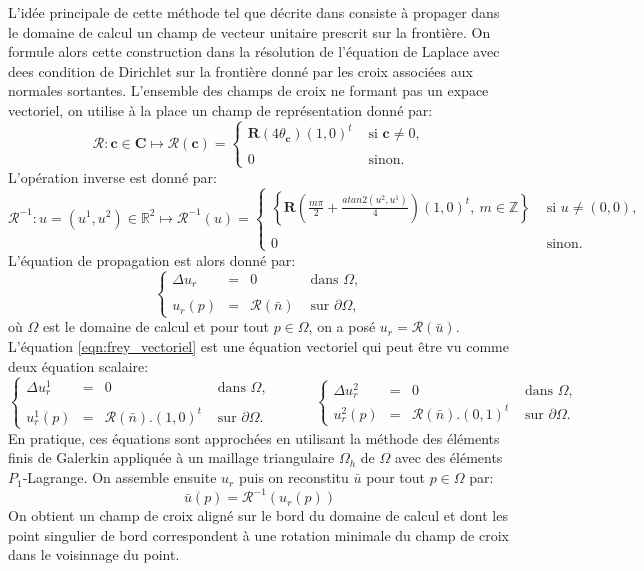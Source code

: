 L'idée principale de cette méthode tel que décrite dans \cite{kowalski2013pde} consiste à propager dans le domaine de calcul un champ de vecteur unitaire prescrit sur la frontière. On formule alors cette construction dans la résolution de l'équation de Laplace avec dees condition de Dirichlet sur la frontière donné par les croix associées aux normales sortantes. L'ensemble des champs de croix ne formant pas un expace vectoriel, on utilise à la place un champ de représentation donné par:
$$
\mathcal{R}: \mathbf{c}\in\mathbf{C}\mapsto\mathcal{R}(\mathbf{c})=
\left\{
\begin{array}{ll}
\mathbf{R}(4\theta_{\mathbf{c}})(1, 0)^t& \mbox{ si }\mathbf{c}\neq 0,\\\\
0&\mbox{ sinon}.
\end{array}
\right.
$$
L'opération inverse est donné par:
$$
\mathcal{R}^{-1}: u=(u^1, u^2)\in\mathbb{R}^2\mapsto\mathcal{R}^{-1}(u)=
\left\{
\begin{array}{ll}
\displaystyle\left\{\mathbf{R}\left(\frac{m\pi}{2}+\frac{atan2(u^2, u^1)}{4}\right)(1, 0)^t,~ m\in \mathbb{Z}\right\} &\mbox{ si }u\neq (0,0),\\\\
0&\mbox{ sinon}.
\end{array}
\right.
$$
L'équation de propagation est alors donné par:
\begin{equation}
\left\{
\begin{array}{lcll}
\Delta u_r &=& 0 &\mbox{ dans }\Omega,\\\\
u_r(p)&=&\mathcal{R}(\bar{n}) & \mbox{ sur } \partial\Omega,
\end{array}
\right.
\label{eqn:frey_vectoriel}
\end{equation}
où $\Omega$ est le domaine de calcul et pour tout $p\in\Omega$, on a posé $u_r=\mathcal{R}(\bar{u})$. L'équation \eqref{eqn:frey_vectoriel} est une équation vectoriel qui peut être vu comme deux équation scalaire:
$$
\left\{
\begin{array}{lcll}
\Delta u_r^1 &=& 0 &\mbox{ dans }\Omega,\\\\
u_r^1(p)&=&\mathcal{R}(\bar{n}).(1, 0)^t & \mbox{ sur } \partial\Omega.
\end{array}
\right.
\quad\quad\quad
\left\{
\begin{array}{lcll}
\Delta u_r^2 &=& 0 &\mbox{ dans }\Omega,\\[0.5cm]
u_r^2(p)&=&\mathcal{R}(\bar{n}).(0, 1)^t & \mbox{ sur } \partial\Omega.
\end{array}
\right.
$$
En pratique, ces équations sont approchées en utilisant la méthode des éléments finis de Galerkin appliquée à un maillage triangulaire $\Omega_h$ de $\Omega$ avec des éléments $P_1$-Lagrange. On assemble ensuite $u_r$ puis on reconstitu $\bar{u}$ pour tout $p\in\Omega$ par:
$$
\bar{u}(p)=\mathcal{R}^{-1}(u_r(p))
$$
On obtient un champ de croix aligné sur le bord du domaine de calcul et dont les point singulier de bord correspondent à une rotation minimale du champ de croix dans le voisinnage du point.


